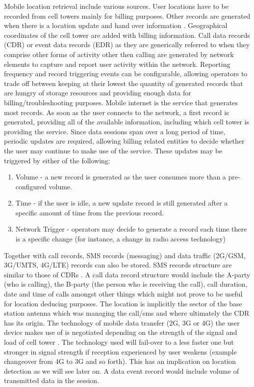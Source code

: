 \documentclass[12pt, a4paper]{report}
\theoremstyle{definition}
\theoremstyle{definition}%
\theoremstyle{definition}%
\theoremstyle{definition}%
\theoremstyle{definition}%
\theoremstyle{definition}%
\begin{document}
Mobile location retrieval include various sources. User locations have to be recorded from cell towers mainly for billing purposes. Other records are generated when there is a location update and hand over information \cite{Calabrese2011}. Geographical coordinates of the cell tower are added with billing information. Call data records (CDR) or event data records (EDR) as they are generically referred to when they comprise other forms of activity other then calling are generated by network elements to capture and report user activity within the network. Reporting frequency and record triggering events can be configurable, allowing operators to trade off between keeping at their lowest the quantity of generated records that are hungry of storage resources and providing enough data for billing/troubleshooting purposes.
Mobile internet is the service that generates most records. As soon as the user connects to the network, a first record is generated, providing all of the available information, including which cell tower is providing the service. Since data sessions span over a long period of time, periodic updates are required, allowing billing related entities to decide whether the user may continue to make use of the service. These updates may be triggered by either of the following:
\begin{enumerate}
\item Volume - a new record is generated as the user consumes more than a pre-configured volume.
\item Time - if the user is idle, a new update record is still generated after a specific amount of time from the previous record.
\item Network Trigger - operators may decide to generate a record each time there is a specific change (for instance, a change in radio access technology)
\end{enumerate}
	
Together with call records, SMS records (messaging) and data traffic (2G/GSM, 3G/UMTS, 4G/LTE) records can also be stored. SMS records structure are similar to those of CDRs \cite{Calabrese2013}. A call data record structure would include the A-party (who is calling), the B-party (the person who is receiving the call), call duration, date and time of calls amongst other things which might not prove to be useful for location deducing purposes. The location is implicitly the sector of the base station antenna which was managing the call/sms and where ultimately the CDR has its origin. The technology of mobile data transfer (2G, 3G or 4G) the user device makes use of is negotiated depending on the strength of the signal and load of cell tower \cite{Liu2014}. The technology used will fail-over to a less faster one but stronger in signal strength if reception experienced by user weakens (example changeover from 4G to 3G and so forth). This has an implication on location detection as we will see later on. A data event record would include volume of transmitted data in the session.
\end{document}
